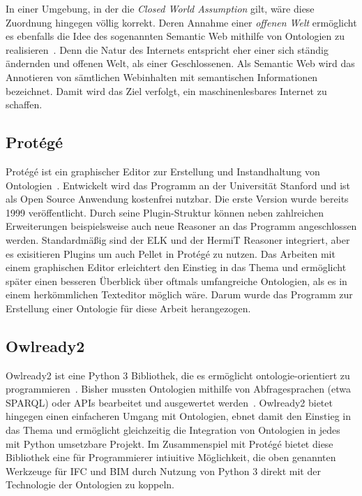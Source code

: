 In einer Umgebung, in der die \textit{Closed World Assumption} gilt, wäre diese Zuordnung hingegen völlig korrekt.
Deren Annahme einer \textit{offenen Welt} ermöglicht es ebenfalls die Idee des sogenannten \glqq{}Semantic Web\grqq{} mithilfe von Ontologien zu realisieren~\cite{SemanticWebLee}.
Denn die Natur des Internets entspricht eher einer sich ständig ändernden und \glqq{}offenen\grqq{} Welt, als einer Geschlossenen.
Als Semantic Web wird das Annotieren von sämtlichen Webinhalten mit semantischen Informationen bezeichnet.
Damit wird das Ziel verfolgt, ein maschinenlesbares Internet zu schaffen. 

\subsection{Protégé}\label{basics:protege}
Protégé ist ein graphischer Editor zur Erstellung und Instandhaltung von Ontologien~\cite{Protege}.
Entwickelt wird das Programm an der Universität Stanford und ist als Open Source Anwendung kostenfrei nutzbar.
Die erste Version wurde bereits 1999 veröffentlicht.
Durch seine Plugin-Struktur können neben zahlreichen Erweiterungen beispielsweise auch neue Reasoner an das Programm angeschlossen werden.
Standardmäßig sind der ELK und der HermiT Reasoner integriert, aber es exisitieren Plugins um auch Pellet in Protégé zu nutzen.
Das Arbeiten mit einem graphischen Editor erleichtert den Einstieg in das Thema und ermöglicht später einen besseren Überblick über oftmals umfangreiche Ontologien, als es in einem herkömmlichen Texteditor möglich wäre.
Darum wurde das Programm zur Erstellung einer Ontologie für diese Arbeit herangezogen.

\subsection{Owlready2}\label{basics:owlready}
Owlready2 ist eine Python 3 Bibliothek, die es ermöglicht \glqq{}ontologie-orientiert\grqq{} zu programmieren~\cite{Owlready}.
Bisher mussten Ontologien mithilfe von Abfragesprachen (etwa SPARQL) oder APIs bearbeitet und ausgewertet werden~\cite{SPARQLF_W3C}.
Owlready2 bietet hingegen einen einfacheren Umgang mit Ontologien, ebnet damit den Einstieg in das Thema und ermöglicht gleichzeitig die Integration von Ontologien in jedes mit Python umsetzbare Projekt.
Im Zusammenspiel mit Protégé bietet diese Bibliothek eine für Programmierer intiuitive Möglichkeit, die oben genannten Werkzeuge für IFC und BIM durch Nutzung von Python 3 direkt mit der Technologie der Ontologien zu koppeln.
